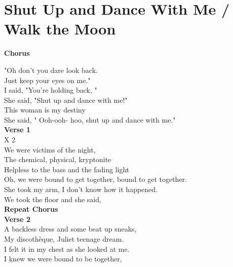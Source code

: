 \section{Shut Up and Dance With Me / Walk the Moon}\label{sec:shutupanddancewithme}

\Gmajor
\Cmajor
\Fmajor
\Aminor

\textbf{Chorus}

 "Oh don't you  dare look  back.\\
Just keep your  eyes on  me."\\
I said, "You're  holding  back, "\\
She said, "Shut  up and  dance with  me!"\\
This  woman is my  destiny \\
She said, " Ooh-ooh- hoo, shut  up and  dance with  me."\\
\textbf{Verse 1}\\
     X 2\\
We were  victims  of the  night,\\
The  chemical,  physical,  kryptonite \\
 Helpless to the  bass and the  fading  light\\
 Oh, we were  bound to get together,  bound to get together.\\
She  took my  arm, I don't know  how it  happened.\\
We  took the  floor and she  said,\\
\textbf{Repeat Chorus}\\
\textbf{Verse 2}\\
A backless  dress and some  beat up  sneaks,\\
My  discothèque,  Juliet  teenage  dream.\\
I  felt it in my  chest as she  looked at  me. \\
I knew we were  bound to be together,\\
